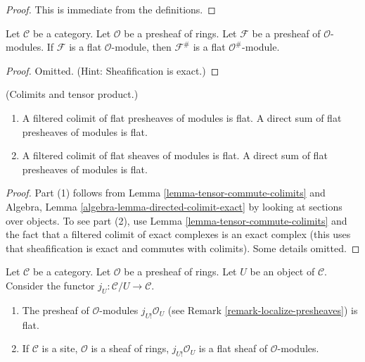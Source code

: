 \begin{proof}
This is immediate from the definitions.
\end{proof}

\begin{lemma}
\label{lemma-flatness-sheafification}
Let $\mathcal{C}$ be a category.
Let $\mathcal{O}$ be a presheaf of rings.
Let $\mathcal{F}$ be a presheaf of $\mathcal{O}$-modules.
If $\mathcal{F}$ is a flat $\mathcal{O}$-module, then
$\mathcal{F}^\#$ is a flat $\mathcal{O}^\#$-module.
\end{lemma}

\begin{proof}
Omitted. (Hint: Sheafification is exact.)
\end{proof}

\begin{lemma}
\label{lemma-colimits-flat}
(Colimits and tensor product.)
\begin{enumerate}
\item A filtered colimit of flat presheaves of modules
is flat. A direct sum of flat presheaves of modules is flat.
\item A filtered colimit of flat sheaves of modules is flat.
A direct sum of flat presheaves of modules is flat.
\end{enumerate}
\end{lemma}

\begin{proof}
Part (1) follows from Lemma \ref{lemma-tensor-commute-colimits} and
Algebra, Lemma \ref{algebra-lemma-directed-colimit-exact}
by looking at sections over objects.
To see part (2), use Lemma \ref{lemma-tensor-commute-colimits} and
the fact that a filtered colimit of exact 
complexes is an exact complex (this uses that sheafification is exact
and commutes with colimits). Some details omitted.
\end{proof}

\begin{lemma}
\label{lemma-j-shriek-flat}
Let $\mathcal{C}$ be a category.
Let $\mathcal{O}$ be a presheaf of rings.
Let $U$ be an object of $\mathcal{C}$.
Consider the functor $j_U : \mathcal{C}/U \to \mathcal{C}$.
\begin{enumerate}
\item The presheaf of $\mathcal{O}$-modules
$j_{U!}\mathcal{O}_U$ (see
Remark \ref{remark-localize-presheaves})
is flat.
\item If $\mathcal{C}$ is a site, $\mathcal{O}$ is a sheaf of rings,
$j_{U!}\mathcal{O}_U$ is a flat sheaf of $\mathcal{O}$-modules.
\end{enumerate}
\end{lemma}

